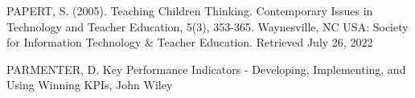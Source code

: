 \documentclass[
12pt,		%
openright,	%
twoside,  %
a4paper,			%
chapter=TITLE,		%
english,			%
french,				%
spanish,			%
brazil				%
]{USPSC-classe/USPSC}
\begin{document}
\begin{flushleft}
\begin{flushleft}
\begin{flushleft}
\begin{flushleft}
\begin{flushleft}
\begin{flushleft}
\begin{flushleft}
\begin{flushleft}
\begin{flushleft}
[PAPERT, 2005] PAPERT, S. (2005). Teaching Children Thinking. Contemporary Issues in Technology and Teacher Education, 5(3), 353-365. Waynesville, NC USA: Society for Information Technology \& Teacher Education. Retrieved July 26, 2022
\end{flushleft}


\end{flushleft}


\end{flushleft}


\end{flushleft}


\end{flushleft}


\end{flushleft}


\end{flushleft}


\end{flushleft}


\end{flushleft}


\begin{flushleft}
\begin{flushleft}
\begin{flushleft}
\begin{flushleft}
\begin{flushleft}
\begin{flushleft}
\begin{flushleft}
\begin{flushleft}
\begin{flushleft}
[PARMENTER, 2007] PARMENTER, D. Key Performance Indicators - Developing, Implementing, and Using Winning KPIs, John Wiley 
\end{flushleft}


\end{flushleft}


\end{flushleft}


\end{flushleft}


\end{flushleft}


\end{flushleft}


\end{flushleft}


\end{flushleft}


\end{flushleft}
\end{document}
